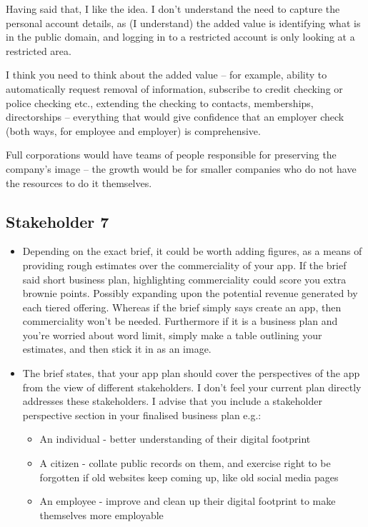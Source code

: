     Having said that, I like the idea.  I don't understand the need to capture the personal account details, as (I understand) the added value is identifying what is in the public domain, and logging in to a restricted account is only looking at a restricted area.

    I think you need to think about the added value – for example, ability to automatically request removal of information, subscribe to credit checking or police checking etc., extending the checking to contacts, memberships, directorships – everything that would give confidence that an employer check (both ways, for employee and employer) is comprehensive.

    Full corporations would have teams of people responsible for preserving the company's image – the growth would be for smaller companies who do not have the resources to do it themselves.

  \subsection{Stakeholder 7}

    \begin{itemize}
      \item Depending on the exact brief, it could be worth adding figures, as a means of providing rough estimates over the commerciality of your app. If the brief said short business plan, highlighting commerciality could score you extra brownie points. Possibly expanding upon the potential revenue generated by each tiered offering. Whereas if the brief simply says create an app, then commerciality won't be needed. Furthermore if it is a business plan and you're worried about word limit, simply make a table outlining your estimates, and then stick it in as an image.
      \item The brief states, that your app plan should cover the perspectives of the app from the view of different stakeholders. I don't feel your current plan directly addresses these stakeholders. I advise that you include a stakeholder perspective section in your finalised business plan e.g.:
      \begin{itemize}
        \item An individual - better understanding of their digital footprint
        \item A citizen - collate public records on them, and exercise right to be forgotten if old websites keep coming up, like old social media pages
        \item An employee - improve and clean up their digital footprint to make themselves more employable
      \end{itemize}
    \end{itemize}
